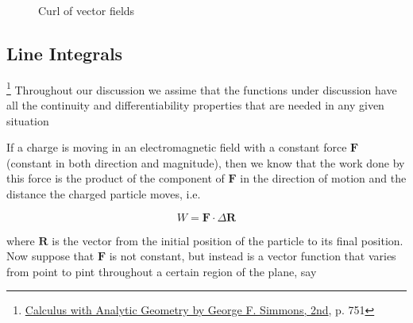\begin{figure}[H]
\begin{subfigure}{.19\textwidth}
    \end{subfigure}
    \begin{subfigure}{.19\textwidth}
        \centering
    \end{subfigure}
    \caption{Curl of vector fields}
    \label{fig:curl-examples}
\end{figure}

\subsection{Line Integrals}

\footnote{\href{https://trello.com/c/byu9Pyy8}{Calculus with Analytic Geometry by George F. Simmons, 2nd}, p. 751}
Throughout our discussion we assime that the functions under discussion have all the continuity and differentiability
properties that are needed in any given situation

If a charge is moving in an electromagnetic field with a constant force $\boldsymbol{F}$ (constant in both direction and
magnitude), then we know that the work done by this force is the product of the component of $\boldsymbol{F}$ in the
direction of motion and the distance the charged particle moves, i.e.

\begin{equation}
    W = \boldsymbol{F} \cdot \Delta \boldsymbol{R}
\end{equation}

where $\boldsymbol{R}$ is the vector from the initial position of the particle to its final position. Now suppose that
$\boldsymbol{F}$ is not constant, but instead is a vector function that varies from point to pint throughout a certain
region of the plane, say

